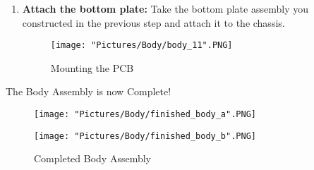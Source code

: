 \documentclass[12pt]{article}
\begin{document}
\begin{enumerate}
\item \textbf{Attach the bottom plate:} Take the bottom plate assembly you constructed in the previous step and attach it to the chassis.

\begin{figure}[H]
	\centering
	\texttt{[image: "Pictures/Body/body\_11".PNG]}
	\caption{Mounting the PCB}
\end{figure}

\end{enumerate}

The Body Assembly is now Complete!

\begin{figure}[H]
  \centering
  \begin{minipage}[b]{0.45\textwidth}
    \texttt{[image: "Pictures/Body/finished\_body\_a".PNG]}
  \end{minipage}
  \hfill
  \begin{minipage}[b]{0.45\textwidth}
    \texttt{[image: "Pictures/Body/finished\_body\_b".PNG]}
  \end{minipage}
  \caption{Completed Body Assembly}
\end{figure}
\end{document}
